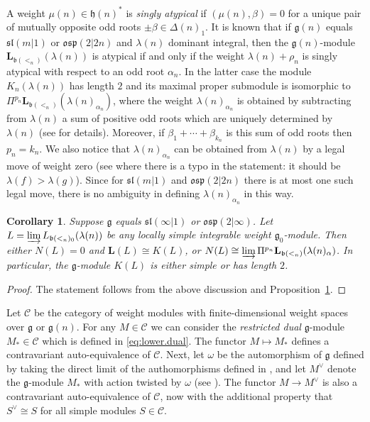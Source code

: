 \documentclass[12pt]{amsart}
\newcommand\g{\mathfrak{g}}
\newcommand\fh{\mathfrak{h}}
\newcommand\fb{\mathfrak{b}}
\newcommand\fsl{\mathfrak{sl}}
\newcommand\fosp{\mathfrak{osp}}
\newcommand\D{\Delta}
\newcommand\cC{\mathcal{C}}
\newcommand\bL{\mathbf{L}}
\theoremstyle{plain}
\newtheorem{cor}[theo]{Corollary}
\theoremstyle{definition}
\numberwithin{equation}{section}
\begin{document}
A weight $\mu(n)\in \fh(n)^*$ is \emph{singly atypical} if $(\mu(n), \beta)=0$ for a unique pair of mutually opposite odd roots $\pm \beta\in \D(n)_1$. It is known that if $\g(n)$ equals $\fsl(m|1)$ or $\fosp(2|2n)$ and $\lambda(n)$ dominant integral, then the $\g(n)$-module $\bL_{\fb(<_n)}(\lambda(n))$ is atypical if and only if the weight $\lambda(n)+\rho_n$ is singly atypical with respect to an odd root $\alpha_n$. In the latter case the module $K_n(\lambda(n))$ has length $2$ and its maximal proper submodule  is isomorphic to $\Pi^{p_n} \bL_{\fb(<_n)}(\lambda(n)_{\alpha_n})$, where the weight $\lambda(n)_{\alpha_n}$ is obtained by subtracting from $\lambda(n)$ a sum of positive odd roots which are uniquely determined by $\lambda(n)$ (see \cite[\S~6~and~7]{VHKT90} for details). Moreover, if $\beta_1+\cdots + \beta_{k_n}$ is this sum of odd roots then $p_n = k_n$. We also notice that $\lambda(n)_{\alpha_n}$ can be obtained from $\lambda(n)$ by a legal move of weight zero (see \cite[Corollary~6.4]{MS11} where there is a typo in the statement: it should be $\lambda(f)>\lambda(g)$). Since for $\fsl(m|1)$ and $\fosp(2|2n)$ there is at most one such legal move, there is no ambiguity in defining $\lambda(n)_{\alpha_n}$ in this way.

\begin{cor}\label{cor:Kac.mod.structure}
Suppose $\g$ equals $\fsl(\infty|1)$ or $\fosp(2|\infty)$.  Let $L = \varinjlim L_{\fb(<_n)_0}(\lambda(n))$ be any locally simple integrable weight $\g_0$-module. Then either $N(L)=0$ and  $\bL(L)\cong K(L)$, or $N(L)\cong \varinjlim  \Pi^{p_n}\bL_{\fb(<_n)}(\lambda(n)_\alpha)$. In particular, the $\g$-module $K(L)$ is either simple or has length $2$.
\end{cor}
\begin{proof}
The statement follows from  the above discussion and Proposition~\ref{cor:Kac.mod.structure}.
\end{proof}

Let $\cC$ be the category of weight modules with finite-dimensional weight spaces over $\g$ or $\g(n)$. For any $M\in \cC$ we can consider the \emph{restricted dual} $\g$-module $M_*\in \cC$ which is defined in \eqref{eq:lower.dual}. The  functor $M\mapsto M_*$ defines a contravariant auto-equivalence of $\cC$. Next, let $\omega$ be the automorphism of $\g$ defined by taking the direct limit of the authomorphisms defined in \cite[\S~5.2]{Mus12}, and let $M^\vee$ denote the $\g$-module $M_*$ with action twisted by $\omega$ (see \cite[pg. 20]{MS11}). The functor $M\to M^\vee$ is also a contravariant auto-equivalence of $\cC$, now with the additional property that $S^\vee\cong S$ for all simple modules $S\in \cC$.
\end{document}
